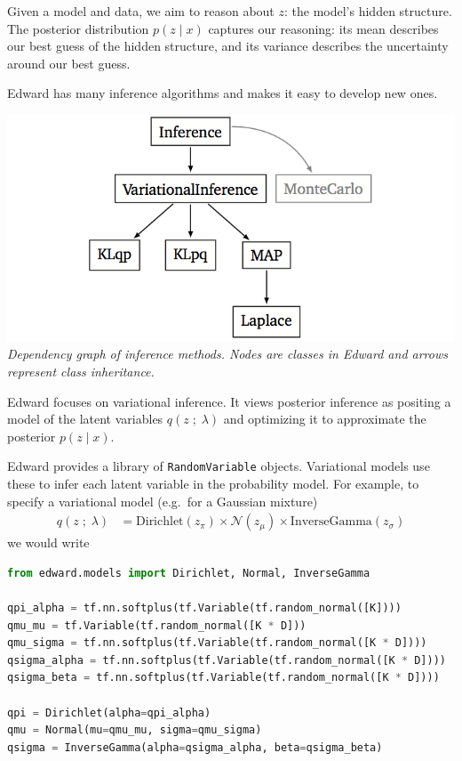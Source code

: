 Given a model and data, we aim to
reason about $z$: the model's hidden structure. The
posterior distribution $p(z \mid x)$ captures our reasoning: its mean
describes our best guess of the hidden structure, and its variance
describes the uncertainty around our best guess.

Edward has many inference algorithms and makes it easy
to develop new ones.

\includegraphics{images/inference_structure.png}
{\small\textit{Dependency graph of inference methods.
Nodes are classes in Edward and arrows represent class inheritance.}}

Edward focuses on variational inference. It views posterior inference
as positing a model of the latent variables $q(z \;;\; \lambda)$ and optimizing it to
approximate the posterior $p(z \mid x)$.


Edward provides a library of
\texttt{RandomVariable} objects. Variational models use these to infer
each latent variable in the probability model.
For example, to specify a variational model (e.g.~for a Gaussian mixture)
\begin{align*}
  q(z \;;\; \lambda)
  &=
  \text{Dirichlet}(z_\pi)
  \times
  \mathcal{N}(z_\mu)
  \times
  \text{InverseGamma}(z_\sigma)
\end{align*}
we would write
\begin{lstlisting}[language=Python]
from edward.models import Dirichlet, Normal, InverseGamma

qpi_alpha = tf.nn.softplus(tf.Variable(tf.random_normal([K])))
qmu_mu = tf.Variable(tf.random_normal([K * D]))
qmu_sigma = tf.nn.softplus(tf.Variable(tf.random_normal([K * D])))
qsigma_alpha = tf.nn.softplus(tf.Variable(tf.random_normal([K * D])))
qsigma_beta = tf.nn.softplus(tf.Variable(tf.random_normal([K * D])))

qpi = Dirichlet(alpha=qpi_alpha)
qmu = Normal(mu=qmu_mu, sigma=qmu_sigma)
qsigma = InverseGamma(alpha=qsigma_alpha, beta=qsigma_beta)
\end{lstlisting}

